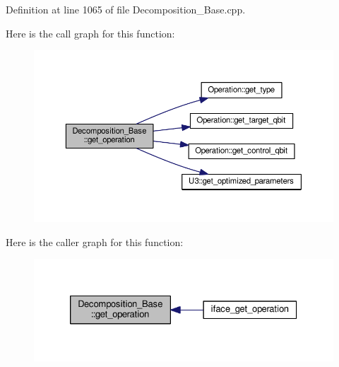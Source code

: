 Definition at line 1065 of file Decomposition\+\_\+\+Base.\+cpp.



Here is the call graph for this function\+:
\nopagebreak
\begin{figure}[H]
\begin{center}
\leavevmode
\includegraphics[width=350pt]{class_decomposition___base_a64e2b692d38fe3ccbd49708d8fa24493_cgraph}
\end{center}
\end{figure}




Here is the caller graph for this function\+:
\nopagebreak
\begin{figure}[H]
\begin{center}
\leavevmode
\includegraphics[width=326pt]{class_decomposition___base_a64e2b692d38fe3ccbd49708d8fa24493_icgraph}
\end{center}
\end{figure}


